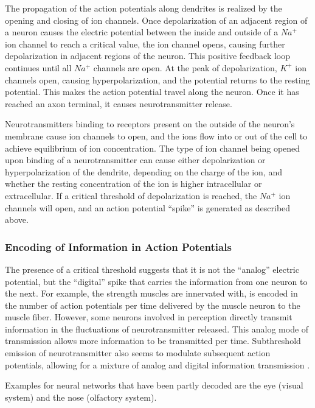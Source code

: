 The propagation of the action potentials along dendrites is realized
by the opening and closing of ion channels. Once depolarization of
an adjacent region of a neuron causes the electric potential between
the inside and outside of a $Na^{+}$ ion channel to reach a critical
value, the ion channel opens, causing further depolarization in adjacent
regions of the neuron. This positive feedback loop continues until
all $Na^{+}$ channels are open. At the peak of depolarization, $K^{+}$
ion channels open, causing hyperpolarization, and the potential returns
to the resting  potential. This makes the action potential travel
along the neuron. Once it has reached an axon terminal, it causes
neurotransmitter release.

Neurotransmitters binding to receptors present on the outside of
the neuron's membrane cause ion channels to open, and the ions flow
into or out of the cell to achieve equilibrium of ion concentration.
The type of ion channel being opened upon binding of a neurotransmitter
can cause either depolarization or hyperpolarization of the dendrite,
depending on the charge of the ion, and whether the resting concentration
of the ion is higher intracellular or extracellular. If a critical
threshold of depolarization is reached, the $Na^{+}$ ion channels
will open, and an action potential ``spike'' is generated as described
above.

\subsubsection{Encoding of Information in Action Potentials}

The presence of a critical threshold suggests that it is not the ``analog''
electric potential, but the ``digital'' spike that carries the information
from one neuron to the next. For example, the strength muscles are
innervated with, is encoded in the number of action potentials per
time delivered by the muscle neuron to the muscle fiber. However,
some neurons involved in perception directly transmit information
in the fluctuations of neurotransmitter released. This analog mode
of transmission allows more information to be transmitted per time.
Sub\-threshold emission of neurotransmitter also seems to modulate
subsequent action potentials, allowing for a mixture of analog and
digital information transmission \cite{DebanneRama2013}. 

Examples for neural networks that have been partly decoded are the
eye (visual system) and the nose (olfactory system).

